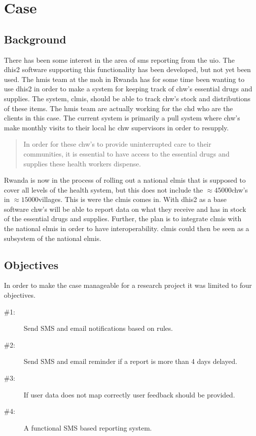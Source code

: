 \chapter{Case}
\label{ch:case}
\section{Background}
There has been some interest in the area of \gls{sms} reporting from the \gls{uio}.
The \gls{dhis2} software supporting this functionality has been developed, but not yet been used.
The \gls{hmis} team at the \gls{moh} in Rwanda has for some time been wanting to use \gls{dhis2} in order to make a system for keeping track of \gls{chw}'s essential drugs and supplies. The system, \gls{clmis}, should be able to track \gls{chw}'s stock and distributions of these items. 
The \gls{hmis} team are actually working for the \gls{chd} who are the clients in this case. 
The current system is primarily a pull system where \gls{chw}'s make monthly visits to their local \gls{hc} \gls{chw} supervisors in order to resupply. 
\begin{quotation}
In order for these \gls{chw}'s to provide uninterrupted care to their communities, it is essential to have access to the essential drugs and supplies these health workers dispense.
\end{quotation}

Rwanda is now in the process of rolling out a national \gls{elmis} that is supposed to cover all levels of the health system, but this does not include the $\approx 45000$\gls{chw}'s in $\approx 15000$villages.
This is were the \gls{clmis} comes in. 
With \gls{dhis2} as a base software \gls{chw}'s will be able to report data on what they receive and has in stock of the essential drugs and supplies. 
Further, the plan is to integrate \gls{clmis} with the national \gls{elmis} in order to have interoperability. 
\gls{clmis} could then be seen as a subsystem of the national \gls{elmis}.


\section{Objectives}
\label{sec:objectives}
In order to make the case manageable for a research project it was limited to four objectives. 

\begin{description}
\item[\#1:] Send SMS and email notifications based on rules.\label{desc:objectiveone}
\item[\#2:] Send SMS and email reminder if a report is more than 4 days delayed.\label{desc:objectivetwo}
\item[\#3:] If user data does not map correctly user feedback should be provided.\label{desc:objectivethree}
\item[\#4:] A functional SMS based reporting system.\label{desc:objectivefour}
\end{description}

